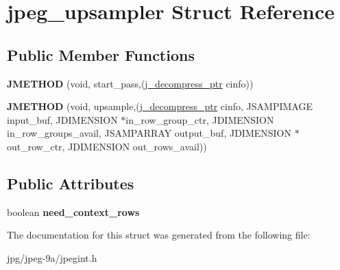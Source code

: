 \hypertarget{structjpeg__upsampler}{\section{jpeg\+\_\+upsampler Struct Reference}
\label{structjpeg__upsampler}
}
\subsection*{Public Member Functions}
\begin{DoxyCompactItemize}
\item 
\hypertarget{structjpeg__upsampler_a01ac725bfe78e05e7671547504a95346}{{\bfseries J\+M\+E\+T\+H\+O\+D} (void, start\+\_\+pass,(\hyperlink{structjpeg__decompress__struct}{j\+\_\+decompress\+\_\+ptr} cinfo))}\label{structjpeg__upsampler_a01ac725bfe78e05e7671547504a95346}

\item 
\hypertarget{structjpeg__upsampler_a23e9af5ee7259d39179063e3ece9fb8f}{{\bfseries J\+M\+E\+T\+H\+O\+D} (void, upsample,(\hyperlink{structjpeg__decompress__struct}{j\+\_\+decompress\+\_\+ptr} cinfo, J\+S\+A\+M\+P\+I\+M\+A\+G\+E input\+\_\+buf, J\+D\+I\+M\+E\+N\+S\+I\+O\+N $\ast$in\+\_\+row\+\_\+group\+\_\+ctr, J\+D\+I\+M\+E\+N\+S\+I\+O\+N in\+\_\+row\+\_\+groups\+\_\+avail, J\+S\+A\+M\+P\+A\+R\+R\+A\+Y output\+\_\+buf, J\+D\+I\+M\+E\+N\+S\+I\+O\+N $\ast$out\+\_\+row\+\_\+ctr, J\+D\+I\+M\+E\+N\+S\+I\+O\+N out\+\_\+rows\+\_\+avail))}\label{structjpeg__upsampler_a23e9af5ee7259d39179063e3ece9fb8f}

\end{DoxyCompactItemize}
\subsection*{Public Attributes}
\begin{DoxyCompactItemize}
\item 
\hypertarget{structjpeg__upsampler_af1ed2e1ca01280221b9c1305fc557e45}{boolean {\bfseries need\+\_\+context\+\_\+rows}}\label{structjpeg__upsampler_af1ed2e1ca01280221b9c1305fc557e45}

\end{DoxyCompactItemize}


The documentation for this struct was generated from the following file\+:\begin{DoxyCompactItemize}
\item 
jpg/jpeg-\/9a/jpegint.\+h\end{DoxyCompactItemize}
